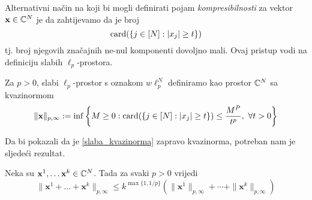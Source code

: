 \documentclass[a4paper,twoside,12pt]{memoir} %
\newcommand{\vect}[1]{\mathbf{#1}}
\renewcommand{\vec}{\vect}
\newcommand{\card}{\text{\normalfont{card}}}
\begin{document}
\indent Alternativni na\v{c}in na koji bi mogli definirati pojam \textit{kompresibilnosti} za vektor $\vec{x}\in\C^N$ je da zahtijevamo da je broj
$$\card(\{j\in[N]:|x_j|\geq t\})$$
tj. broj njegovih zna\v{c}ajnih ne-nul komponenti dovoljno mali. Ovaj pristup vodi na definiciju slabih $\ell_p$-prostora.
\begin{defn}
Za $p>0$, slabi $\ell_p$-prostor s oznakom $w\ell_p^N$ definiramo kao prostor $\mathbb{C}^N$ sa kvazinormom
\begin{equation}\label{slaba_kvazinorma}
    \|\vec{x}\|_{p, \infty}:=\inf\bigg\{ M \geq 0: \card (\{j\in [N]: |x_j|\geq t \})\leq \frac{M^P}{t^p},\ \forall t>0    \bigg\}
\end{equation}
\end{defn}
\noindent
Da bi pokazali da je \eqref{slaba_kvazinorma} zapravo kvazinorma, potreban nam je sljede\'ci rezultat.
\begin{prop}
    Neka su $\vec{x}^1,\dots\vec{x}^k\in\C^N$. Tada za svaki $p>0$ vrijedi 
    \begin{equation*}
    \|\vec{x}^1+\dots+\vec{x}^k\|_{p,\infty} \leq k^{\max\{1, 1/p\}}(\|\vec{x}^1\|_{p, \infty} + \cdots + \|\vec{x}^k\|_{p, \infty})
    \end{equation*}
\end{prop}
\end{document}

